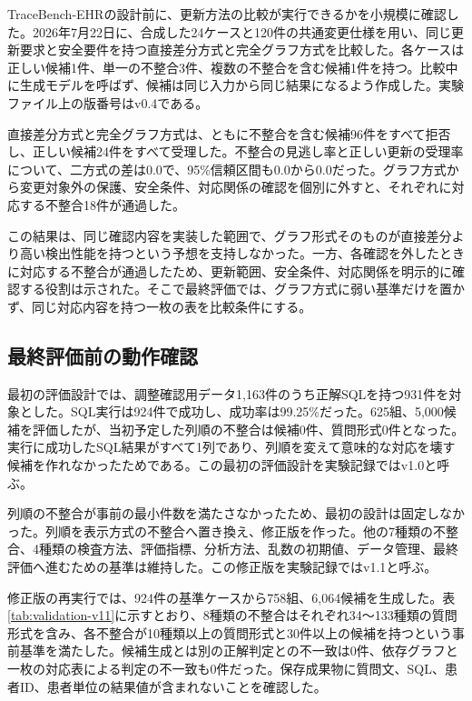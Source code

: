 \documentclass[a4paper]{jsarticle}
\begin{document}
TraceBench-EHRの設計前に、更新方法の比較が実行できるかを小規模に確認した。2026年7月22日に、合成した24ケースと120件の共通変更仕様を用い、同じ更新要求と安全要件を持つ直接差分方式と完全グラフ方式を比較した。各ケースは正しい候補1件、単一の不整合3件、複数の不整合を含む候補1件を持つ。比較中に生成モデルを呼ばず、候補は同じ入力から同じ結果になるよう作成した。実験ファイル上の版番号はv0.4である。

直接差分方式と完全グラフ方式は、ともに不整合を含む候補96件をすべて拒否し、正しい候補24件をすべて受理した。不整合の見逃し率と正しい更新の受理率について、二方式の差は0.0で、95\%信頼区間も0.0から0.0だった。グラフ方式から変更対象外の保護、安全条件、対応関係の確認を個別に外すと、それぞれに対応する不整合18件が通過した。

この結果は、同じ確認内容を実装した範囲で、グラフ形式そのものが直接差分より高い検出性能を持つという予想を支持しなかった。一方、各確認を外したときに対応する不整合が通過したため、更新範囲、安全条件、対応関係を明示的に確認する役割は示された。そこで最終評価では、グラフ方式に弱い基準だけを置かず、同じ対応内容を持つ一枚の表を比較条件にする。

\subsection{最終評価前の動作確認}

最初の評価設計では、調整確認用データ1,163件のうち正解SQLを持つ931件を対象とした。SQL実行は924件で成功し、成功率は99.25\%だった。625組、5,000候補を評価したが、当初予定した列順の不整合は候補0件、質問形式0件となった。実行に成功したSQL結果がすべて1列であり、列順を変えて意味的な対応を壊す候補を作れなかったためである。この最初の評価設計を実験記録ではv1.0と呼ぶ。

列順の不整合が事前の最小件数を満たさなかったため、最初の設計は固定しなかった。列順を表示方式の不整合へ置き換え、修正版を作った。他の7種類の不整合、4種類の検査方法、評価指標、分析方法、乱数の初期値、データ管理、最終評価へ進むための基準は維持した。この修正版を実験記録ではv1.1と呼ぶ。

修正版の再実行では、924件の基準ケースから758組、6,064候補を生成した。表\ref{tab:validation-v11}に示すとおり、8種類の不整合はそれぞれ34～133種類の質問形式を含み、各不整合が10種類以上の質問形式と30件以上の候補を持つという事前基準を満たした。候補生成とは別の正解判定との不一致は0件、依存グラフと一枚の対応表による判定の不一致も0件だった。保存成果物に質問文、SQL、患者ID、患者単位の結果値が含まれないことを確認した。
\end{document}
